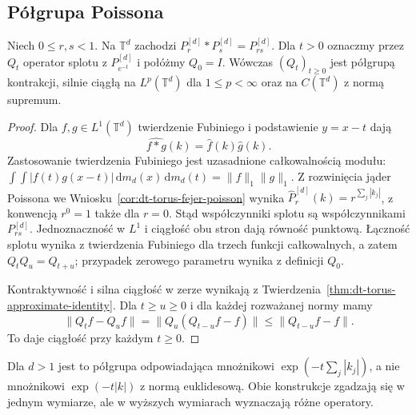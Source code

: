 \subsection{Półgrupa Poissona}

\begin{twierdzenie}
\label{thm:dt-poisson-semigroup}
Niech $0\le r,s<1$. Na $\mathbb T^d$ zachodzi
$P_r^{[d]}*P_s^{[d]}=P_{rs}^{[d]}$.
Dla $t>0$ oznaczmy przez $Q_t$ operator splotu
z $P_{e^{-t}}^{[d]}$ i połóżmy $Q_0=I$.
Wówczas $(Q_t)_{t\ge0}$ jest półgrupą kontrakcji,
silnie ciągłą na $L^p(\mathbb T^d)$ dla
$1\le p<\infty$ oraz na $C(\mathbb T^d)$
z normą supremum.
\end{twierdzenie}
\begin{proof}
Dla $f,g\in L^1(\mathbb T^d)$ twierdzenie
Fubiniego i podstawienie $y=x-t$ dają
\[
 \widehat{f*g}(k)=\widehat f(k)\widehat g(k).
\]
Zastosowanie twierdzenia Fubiniego jest
uzasadnione całkowalnością modułu:
$\int\!\int |f(t)g(x-t)|\,\mathrm dm_d(x)\,\mathrm dm_d(t)
=\|f\|_1\|g\|_1$.
Z rozwinięcia jąder Poissona we
Wniosku~\ref{cor:dt-torus-fejer-poisson} wynika
$\widehat P_r^{[d]}(k)=r^{\sum_j|k_j|}$,
z konwencją $r^0=1$ także dla $r=0$.
Stąd współczynniki splotu są współczynnikami
$P_{rs}^{[d]}$. Jednoznaczność w $L^1$ i ciągłość
obu stron dają równość punktową.
Łączność splotu wynika z twierdzenia Fubiniego
dla trzech funkcji całkowalnych, a zatem
$Q_tQ_u=Q_{t+u}$; przypadek zerowego parametru
wynika z definicji $Q_0$.

Kontraktywność i silna ciągłość w zerze
wynikają z Twierdzenia~\ref{thm:dt-torus-approximate-identity}.
Dla $t\ge u\ge0$ i dla każdej rozważanej normy mamy
\[
 \|Q_tf-Q_uf\|
 =\|Q_u(Q_{t-u}f-f)\|
 \le\|Q_{t-u}f-f\|.
\]
To daje ciągłość przy każdym $t\ge0$.
\end{proof}

\begin{uwaga}
Dla $d>1$ jest to półgrupa odpowiadająca mnożnikowi
$\exp(-t\sum_j|k_j|)$, a nie mnożnikowi
$\exp(-t|k|)$ z normą euklidesową.
Obie konstrukcje zgadzają się w jednym wymiarze,
ale w wyższych wymiarach wyznaczają różne operatory.
\end{uwaga}

